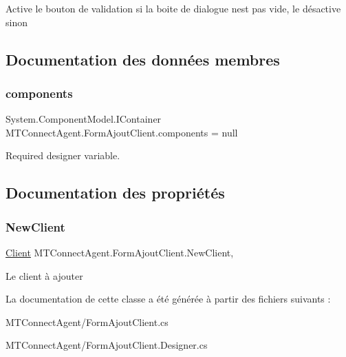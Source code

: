 Active le bouton de validation si la boite de dialogue n\textquotesingle{}est pas vide, le désactive sinon 



\subsection{Documentation des données membres}
\mbox{\label{class_m_t_connect_agent_1_1_form_ajout_client_aaa9221b352c79976eee17048d4a786db}} 
\subsubsection{\texorpdfstring{components}{components}}
{\footnotesize\ttfamily System.\+Component\+Model.\+I\+Container M\+T\+Connect\+Agent.\+Form\+Ajout\+Client.\+components = null\hspace{0.3cm}{\ttfamily [private]}}



Required designer variable. 



\subsection{Documentation des propriétés}
\mbox{\label{class_m_t_connect_agent_1_1_form_ajout_client_a0866b4e0d65bb3844726b9f18c8af35e}} 
\subsubsection{\texorpdfstring{New\+Client}{NewClient}}
{\footnotesize\ttfamily \mbox{\hyperlink{class_m_t_connect_agent_1_1_model_1_1_client}{Client}} M\+T\+Connect\+Agent.\+Form\+Ajout\+Client.\+New\+Client\hspace{0.3cm}{\ttfamily [get]}, {\ttfamily [set]}}



Le client à ajouter 



La documentation de cette classe a été générée à partir des fichiers suivants \+:\begin{DoxyCompactItemize}
\item 
M\+T\+Connect\+Agent/Form\+Ajout\+Client.\+cs\item 
M\+T\+Connect\+Agent/Form\+Ajout\+Client.\+Designer.\+cs\end{DoxyCompactItemize}
